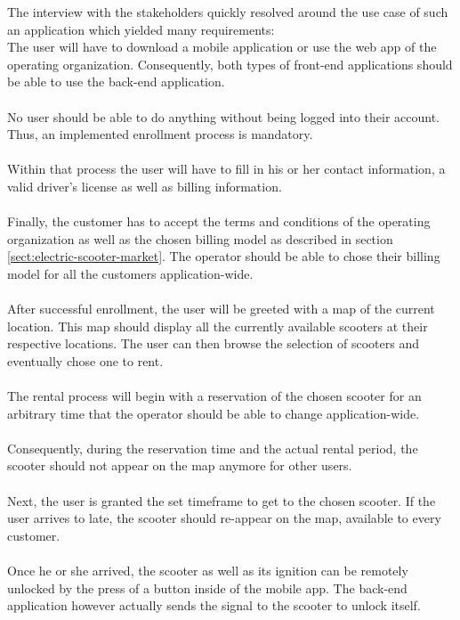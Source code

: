 \documentclass[12pt,a4paper,twoside]{report}
\begin{document}
The interview with the stakeholders quickly resolved around the use case
of such an application which yielded many requirements:\\

The user will have to download a mobile application or use the web app
of the operating organization. Consequently, both types of front-end applications
should be able to use the back-end application.\\\\
No user should be able to do anything without being logged into their account.
Thus, an implemented enrollment process is mandatory.\\\\
Within that process the user will have to fill in his or her
contact information, a valid driver's license as well as billing information.\\\\
Finally, the customer has to accept the terms and conditions of the operating
organization as well as the chosen billing model as described in
section \ref{sect:electric-scooter-market}. The operator should be able to chose
their billing model for all the customers application-wide.\\\\
After successful enrollment, the user will be greeted with a map of the current
location. This map should display all the currently available scooters at
their respective locations. The user can then browse the selection
of scooters and eventually chose one to rent.\\\\
The rental process will begin with a reservation of the chosen scooter for
an arbitrary time that the operator should be able to change application-wide.\\\\
Consequently, during the reservation time and the actual rental period,
the scooter should not appear on the map anymore for other users.\\\\
Next, the user is granted the set timeframe to get to the chosen scooter.
If the user arrives to late, the scooter should re-appear on the map,
available to every customer.\\\\
Once he or she arrived, the scooter as well as its ignition can be remotely
unlocked by the press of a button inside of the mobile app.
The back-end application however actually sends the signal to the scooter to
unlock itself.\\\\
\end{document}
